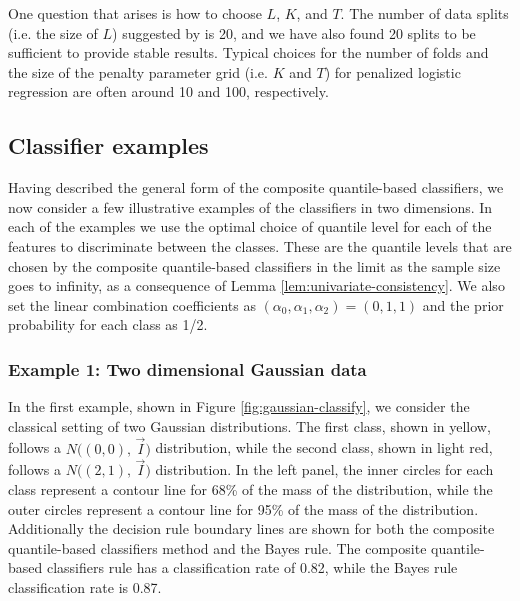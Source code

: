 One question that arises is how to choose $L$, $K$, and $T$.  The number of data
splits (i.e. the size of $L$) suggested by \cite{fan2016} is 20, and we have
also found 20 splits to be sufficient to provide stable results.  Typical
choices for the number of folds and the size of the penalty parameter grid
(i.e. $K$ and $T$) for penalized logistic regression are often around 10 and
100, respectively.




\subsection{Classifier examples}
\label{sec:classifier-examples}

Having described the general form of the composite quantile-based classifiers,
we now consider a few illustrative examples of the classifiers in two
dimensions.  In each of the examples we use the optimal choice of quantile level
for each of the features to discriminate between the classes.  These are the
quantile levels that are chosen by the composite quantile-based classifiers in
the limit as the sample size goes to infinity, as a consequence of Lemma
\ref{lem:univariate-consistency}.  We also set the linear combination
coefficients as $(\alpha_0, \alpha_1, \alpha_2) = (0, 1, 1)$ and the prior
probability for each class as 1/2.




\subsubsection*{Example 1:  Two dimensional Gaussian data}
\label{sec:classifier-examples-gaussian}

In the first example, shown in Figure \ref{fig:gaussian-classify}, we consider
the classical setting of two Gaussian distributions.  The first class, shown in
yellow, follows a $N \big( (0, 0),\, \vec{I} \big)$ distribution, while the
second class, shown in light red, follows a $N \big( (2, 1),\, \vec{I} \big)$
distribution.  In the left panel, the inner circles for each class represent a
contour line for 68\% of the mass of the distribution, while the outer circles
represent a contour line for 95\% of the mass of the distribution.  Additionally
the decision rule boundary lines are shown for both the composite quantile-based
classifiers method and the Bayes rule.  The composite quantile-based classifiers
rule has a classification rate of 0.82, while the Bayes rule classification rate
is 0.87.

